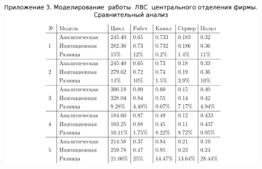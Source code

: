 \documentclass[russian,utf8,emptystyle]{eskdtext}
\begin{document}
\begin{landscape}
\clearpage
{}
\begin{figure}[h!]
\centering
\includegraphics[scale=0.9]{appendix/appendix_3_5}
\end{figure}

\end{landscape}
\end{document}
